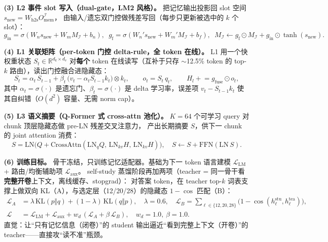 \documentclass[11pt,a4paper]{ctexart}
\begin{document}
\noindent\textbf{(3) L2 事件 slot 写入（dual-gate，LM2 风格）。} 把记忆输出投影回 slot 空间 $s_{\text{new}}=W_{\text{h2s}}O_{\text{mem}}^{\mathcal I}$，
由输入/遗忘双门控做残差写回（每步只更新被选中的 $k$ 个 slot）：
\begin{equation*}
g_{\text{in}}=\sigma(W_n s_{\text{new}}{+}W_m M_{\mathcal I}{+}b_n),\;\;
g_{\text{f}}=\sigma(W_n' s_{\text{new}}{+}W_m' M_{\mathcal I}{+}b_f),\;\;
M_{\mathcal I}\leftarrow g_{\text{f}}\odot M_{\mathcal I}+g_{\text{in}}\odot\tanh(s_{\text{new}}).
\end{equation*}

\noindent\textbf{(4) L1 关联矩阵（per-token 门控 delta-rule，全 token 在线）。} L1 用一个快权重状态 $S_t\in\mathbb{R}^{d_k\times d_v}$
对\textbf{每个} token 在线读写（互补于只存 $\sim$12.5\% token 的 top-$k$ 路由），读出门控融合进隐藏态：
\begin{equation*}
S_t=\alpha_t\,S_{t-1}+\beta_t\,\big(v_t-\alpha_t S_{t-1}k_t\big)\otimes k_t,\qquad
o_t=S_t\,q_t,\qquad H_l\!\mathrel{+}=g_{\text{fuse}}\odot o_t,
\end{equation*}
其中 $\alpha_t=\sigma(\cdot)$ 是遗忘门、$\beta_t=\sigma(\cdot)$ 是 delta 学习率，误差项 $v_t-S_{t-1}k_t$ 使其自纠错（$O(d^2)$ 容量、无需 norm cap）。

\noindent\textbf{(5) L3 语义摘要（Q-Former 式 cross-attn 池化）。} $K{=}64$ 个可学习 query 对 chunk 顶层隐藏态做 pre-LN 残差交叉注意力，
产出长期摘要 $S$，供下一 chunk 的 joint attention 消费：
\begin{equation*}
S=\mathrm{LN}\big(Q+\mathrm{CrossAttn}(\mathrm{LN}_q Q,\,\mathrm{LN}_{kv}H,\,\mathrm{LN}_{kv}H)\big),\quad S\leftarrow S+\mathrm{FFN}(\mathrm{LN}\,S).
\end{equation*}

\noindent\textbf{(6) 训练目标。} 骨干冻结，只训练记忆适配器。基础为下一 token 语言建模 $\mathcal L_{\text{LM}}$ + 路由/均衡辅助项 $\mathcal L_{\text{aux}}$。
self-study 蒸馏阶段再加两项（teacher = 同一骨干看\textbf{完整开卷}上下文，离线缓存、stopgrad）：
对答案 token，在 teacher top-$k$ 词表支撑上做双向 KL（A），与选定层（12/20/28）的隐藏态 $1{-}\cos$ 匹配（B）：
\begin{align*}
\mathcal L_{A}&=\lambda\,\mathrm{KL}(p\Vert q)+(1{-}\lambda)\,\mathrm{KL}(q\Vert p),\quad \lambda{=}0.6,\quad
\mathcal L_{B}=\textstyle\sum_{\ell\in\{12,20,28\}}\big(1-\cos(h^{\text{stu}}_\ell,h^{\text{tea}}_\ell)\big),\\
\mathcal L&=\mathcal L_{\text{LM}}+\mathcal L_{\text{aux}}+w_d\,(\mathcal L_{A}+\beta\,\mathcal L_{B}),\quad w_d{=}1.0,\ \beta{=}1.0 .
\end{align*}
直觉：让“只有记忆信息（闭卷）”的 student 输出逼近“看到完整上下文（开卷）”的 teacher——直接攻“读不准”瓶颈。
\end{document}
